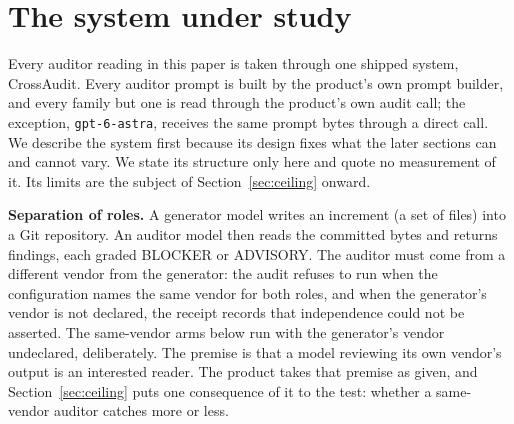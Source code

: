 \section{The system under study}
\label{sec:system}

Every auditor reading in this paper is taken through one shipped system, CrossAudit. Every auditor
prompt is built by the product's own prompt builder, and every family but one is read through
the product's own audit call; the exception, \texttt{gpt-6-astra}, receives the same prompt
bytes through a direct call. We describe the system first because
its design fixes what the later sections can and cannot vary. We state its structure only here
and quote no measurement of it. Its limits are the subject of
Section~\ref{sec:ceiling} onward.

\textbf{Separation of roles.} A generator model writes an increment (a set of files) into a Git
repository. An auditor model then reads the committed bytes and returns findings, each graded
BLOCKER or ADVISORY. The auditor must come from a different vendor from the generator: the audit
refuses to run when the configuration names the same vendor for both roles, and when the
generator's vendor is not declared, the receipt records that independence could not be asserted.
The same-vendor arms below run with the generator's vendor undeclared, deliberately. The premise is that a model
reviewing its own vendor's output is an interested reader. The product takes that premise as given, and Section~\ref{sec:ceiling} puts
one consequence of it to the test: whether a same-vendor auditor catches more or less.

